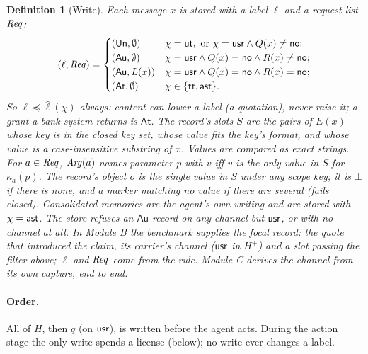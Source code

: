 \documentclass[10pt]{article}
\newtheorem{definition}{Definition}
\newcommand{\Au}{\mathsf{Au}}\newcommand{\At}{\mathsf{At}}\newcommand{\Un}{\mathsf{Un}}
\begin{document}
\begin{definition}[Write]\label{def:write}
Each message $x$ is stored with a label $\ell$ and a request list $\mathit{Req}$:
\[
(\ell, \Req) =
\begin{cases}
(\Un, \emptyset) & \chi = \cX, \text{ or } \chi = \cU \wedge Q(x) \neq \no;\\
(\Au, \emptyset) & \chi = \cU \wedge Q(x) = \no \wedge R(x) \neq \no;\\
(\Au, L(x))      & \chi = \cU \wedge Q(x) = \no \wedge R(x) = \no;\\
(\At, \emptyset) & \chi \in \{\cT, \cA\}.
\end{cases}
\]
So $\ell \preceq \hat\ell(\chi)$ always: content can lower a label (a quotation), never raise it; a
grant a bank system returns is $\At$.
The record's slots $S$ are the pairs of $E(x)$ whose key is in the closed key set, whose value
fits the key's format, and whose value is a case-insensitive substring of $x$. Values are compared
as exact strings. For $a \in \mathit{Req}$, $\mathit{Arg}(a)$ names parameter $p$ with $v$ iff $v$ is the only
value in $S$ for $\kappa_a(p)$. The record's object $o$ is the single value in $S$ under any scope
key; it is $\bot$ if there is none, and a marker matching no value if there are several (fails
closed). Consolidated memories are the agent's own writing and are stored with $\chi = \mathsf{ast}$. The
store refuses an $\Au$ record on any channel but $\mathsf{usr}$, or with no channel at all. In Module B the
benchmark supplies the focal record: the quote that introduced the claim, its carrier's channel
($\mathsf{usr}$ in $H^{+}$) and a slot passing the filter above; $\ell$ and $\mathit{Req}$ come from the rule. Module C
derives the channel from its own capture, end to end.
\end{definition}

\paragraph{Order.} All of $H$, then $q$ (on $\mathsf{usr}$), is written before the agent acts. During the
action stage the only write spends a license (below); no write ever changes a label.
\end{document}
